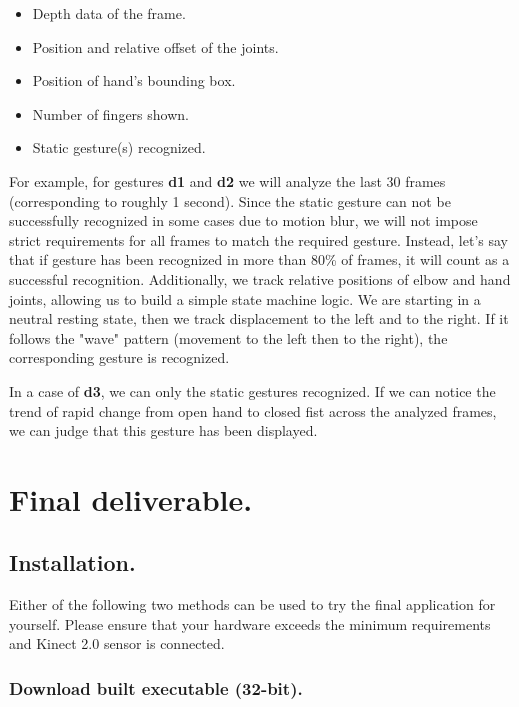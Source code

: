 \documentclass[a4paper,11pt,oneside]{article}
\begin{document}
\begin{itemize}
\item Depth data of the frame.
\item Position and relative offset of the joints.
\item Position of hand's bounding box.
\item Number of fingers shown.
\item Static gesture(s) recognized.
\end{itemize}
 

For example, for gestures \textbf{d1} and \textbf{d2} we will analyze the last 30 frames (corresponding to roughly 1 second). Since the static gesture can not be successfully recognized in some cases due to motion blur, we will not impose strict requirements for all frames to match the required gesture. Instead, let's say that if gesture has been recognized in more than 80\% of frames, it will count as a successful recognition. Additionally, we track relative positions of elbow and hand joints, allowing us to build a simple state machine logic. We are starting in a neutral resting state, then we track displacement to the left and to the right. If it follows the "wave" pattern (movement to the left then to the right), the corresponding gesture is recognized.

In a case of \textbf{d3}, we can only the static gestures recognized. If we can notice the trend of rapid change from open hand to closed fist across the analyzed frames, we can judge that this gesture has been displayed. 

\section{Final deliverable.}

\subsection{Installation.}

Either of the following two methods can be used to try the final application for yourself. Please ensure that your hardware exceeds the minimum requirements and Kinect 2.0 sensor is connected.

\subsubsection{Download built executable (32-bit).}
\end{document}
